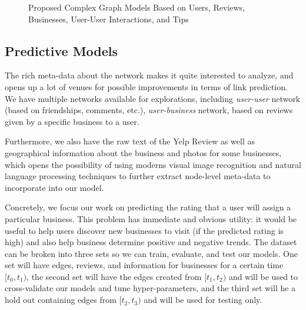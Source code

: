 \documentclass[letterpaper, 10 pt, conference]{ieeeconf}  %
\begin{document}
\begin{figure}[h!]
\caption{Proposed Complex Graph Models Based on Users, Reviews, Businesses, User-User Interactions, and Tips}
\label{fig:graph_complex_structure}
\end{figure}

\subsection{Predictive Models}
The rich meta-data about the network makes it quite interested to analyze, and opens up a lot of venues for possible improvements in terms of link prediction. We have multiple networks available for explorations, including \textit{user-user} network (based on friendships, comments, etc.), \textit{user-business} network, based on reviews given by a specific business to a user.

Furthermore, we also have the raw text of the Yelp Review as well as geographical information about the business and photos for some businesses, which opens the possibility of using moderns visual image recognition and natural language processing techniques to further extract node-level meta-data to incorporate into our model.

Concretely, we focus our work on predicting the rating that a user will assign a particular business. This problem has immediate and obvious utility: it would be useful to help users discover new businesses to visit (if the predicted rating is high) and also help business determine positive and negative trends. The dataset can be broken into three sets so we can train, evaluate, and test our models. One set will have edges, reviews, and information for businesses for a certain time $[t_0, t_1)$, the second set will have the edges created from $[t_1, t_2)$ and will be used to cross-validate our models and tune hyper-parameters, and the third set will he a hold out containing edges from $[t_2, t_3)$ and will be used for testing only.
\end{document}
